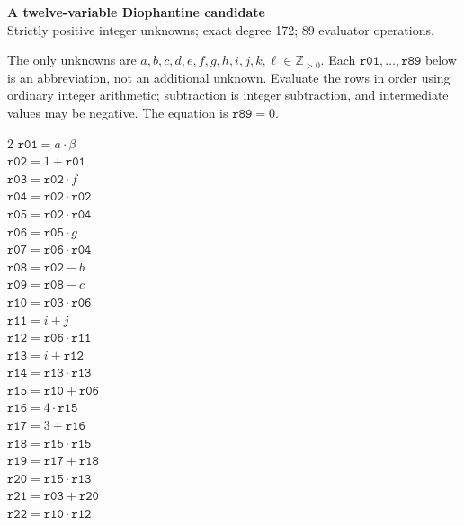 \documentclass[10pt]{article}
\begin{document}
\begin{center}
{\large\bfseries A twelve-variable Diophantine candidate}\\
{\small Strictly positive integer unknowns; exact degree 172; 89 evaluator operations.}
\end{center}
The only unknowns are \(a,b,c,d,e,f,g,h,i,j,k,\ell\in\mathbb Z_{>0}\).
Each \(\mathtt{r01},\ldots,\mathtt{r89}\) below is an abbreviation,
not an additional unknown. Evaluate the rows in order using ordinary integer
arithmetic; subtraction is integer subtraction, and intermediate values may be
negative. The equation is
\(\boxed{\mathtt{r89}=0}\).

\begin{multicols}{2}\small
\(\mathtt{r01} = a \cdot \beta\)\\
\(\mathtt{r02} = 1 + \mathtt{r01}\)\\
\(\mathtt{r03} = \mathtt{r02} \cdot f\)\\
\(\mathtt{r04} = \mathtt{r02} \cdot \mathtt{r02}\)\\
\(\mathtt{r05} = \mathtt{r02} \cdot \mathtt{r04}\)\\
\(\mathtt{r06} = \mathtt{r05} \cdot g\)\\
\(\mathtt{r07} = \mathtt{r06} \cdot \mathtt{r04}\)\\
\(\mathtt{r08} = \mathtt{r02} - b\)\\
\(\mathtt{r09} = \mathtt{r08} - c\)\\
\(\mathtt{r10} = \mathtt{r03} \cdot \mathtt{r06}\)\\
\(\mathtt{r11} = i + j\)\\
\(\mathtt{r12} = \mathtt{r06} \cdot \mathtt{r11}\)\\
\(\mathtt{r13} = i + \mathtt{r12}\)\\
\(\mathtt{r14} = \mathtt{r13} \cdot \mathtt{r13}\)\\
\(\mathtt{r15} = \mathtt{r10} + \mathtt{r06}\)\\
\(\mathtt{r16} = 4 \cdot \mathtt{r15}\)\\
\(\mathtt{r17} = 3 + \mathtt{r16}\)\\
\(\mathtt{r18} = \mathtt{r15} \cdot \mathtt{r15}\)\\
\(\mathtt{r19} = \mathtt{r17} + \mathtt{r18}\)\\
\(\mathtt{r20} = \mathtt{r15} \cdot \mathtt{r13}\)\\
\(\mathtt{r21} = \mathtt{r03} + \mathtt{r20}\)\\
\(\mathtt{r22} = \mathtt{r10} \cdot \mathtt{r12}\)\\

\end{multicols}
\end{document}
